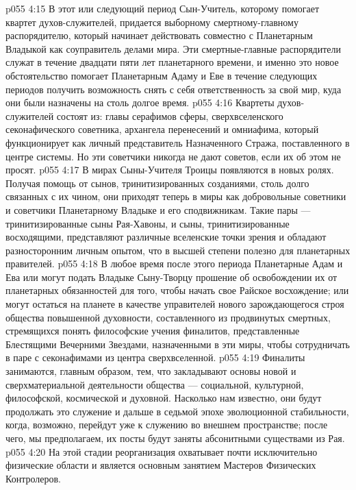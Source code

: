 \vs p055 4:15 В этот или следующий период Сын\hyp{}Учитель, которому помогает квартет духов\hyp{}служителей, придается выборному смертному\hyp{}главному распорядителю, который начинает действовать совместно с Планетарным Владыкой как соуправитель делами мира. Эти смертные\hyp{}главные распорядители служат в течение двадцати пяти лет планетарного времени, и именно это новое обстоятельство помогает Планетарным Адаму и Еве в течение следующих периодов получить возможность снять с себя ответственность за свой мир, куда они были назначены на столь долгое время.
\vs p055 4:16 Квартеты духов\hyp{}служителей состоят из: главы серафимов сферы, сверхвселенского секонафического советника, архангела перенесений и омниафима, который функционирует как личный представитель Назначенного Стража, поставленного в центре системы. Но эти советчики никогда не дают советов, если их об этом не просят.
\vs p055 4:17 \bibnobreakspace {} В мирах Сыны\hyp{}Учителя Троицы появляются в новых ролях. Получая помощь от сынов, тринитизированных созданиями, столь долго связанных с их чином, они приходят теперь в миры как добровольные советники и советчики Планетарному Владыке и его сподвижникам. Такие пары --- тринитизированные сыны Рая\hyp{}Хавоны, и сыны, тринитизированные восходящими, представляют различные вселенские точки зрения и обладают разносторонним личным опытом, что в высшей степени полезно для планетарных правителей.
\vs p055 4:18 В любое время после этого периода Планетарные Адам и Ева или могут подать Владыке Сыну\hyp{}Творцу прошение об освобождении их от планетарных обязанностей для того, чтобы начать свое Райское восхождение; или могут остаться на планете в качестве управителей нового зарождающегося строя общества повышенной духовности, составленного из продвинутых смертных, стремящихся понять философские учения финалитов, представленные Блестящими Вечерними Звездами, назначенными в эти миры, чтобы сотрудничать в паре с секонафимами из центра сверхвселенной.
\vs p055 4:19 Финалиты занимаются, главным образом, тем, что закладывают основы новой и сверхматериальной деятельности общества --- социальной, культурной, философской, космической и духовной. Насколько нам известно, они будут продолжать это служение и дальше в седьмой эпохе эволюционной стабильности, когда, возможно, перейдут уже к служению во внешнем пространстве; после чего, мы предполагаем, их посты будут заняты абсонитными существами из Рая.
\vs p055 4:20 \pc {}\bibnobreakspace {} На этой стадии реорганизация охватывает почти исключительно физические области и является основным занятием Мастеров Физических Контролеров.
